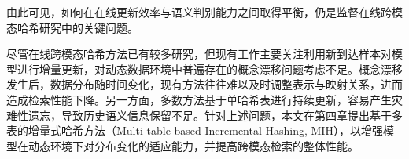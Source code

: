 由此可见，如何在在线更新效率与语义判别能力之间取得平衡，仍是监督在线跨模态哈希研究中的关键问题。

尽管在线跨模态哈希方法已有较多研究，但现有工作主要关注利用新到达样本对模型进行增量更新，对动态数据环境中普遍存在的概念漂移问题考虑不足。概念漂移发生后，数据分布随时间变化，现有方法往往难以及时调整表示与映射关系，进而造成检索性能下降。另一方面，多数方法基于单哈希表进行持续更新，容易产生灾难性遗忘，导致历史语义信息保留不足。针对上述问题，本文在第四章提出基于多表的增量式哈希方法（Multi-table based Incremental Hashing, MIH），以增强模型在动态环境下对分布变化的适应能力，并提高跨模态检索的整体性能。
